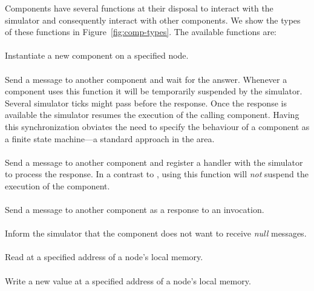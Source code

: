 Components have several functions at their disposal to interact with the simulator and consequently interact with other components.
We show the types of these functions in Figure~\ref{fig:comp-types}.
The available functions are:

\paragraph{}
Instantiate a new component on a specified node.
\paragraph{}
Send a message to another component and wait for the answer.
Whenever a component uses this function it will be temporarily suspended by the simulator.
Several simulator ticks might pass before the %
response.
Once the response is
available the simulator resumes the execution of the calling component.
Having this synchronization obviates the need to specify the behaviour of a component as a finite state machine---a standard approach in the area.
\paragraph{}
Send a message to another component and register a handler with the simulator to process the response.
In a contrast to , using this function will \emph{not} suspend the execution of the component.
\paragraph{}
Send a message to another component as a response to an invocation.
\paragraph{}
Inform the simulator that the component does not want to receive
\emph{null} messages.
\paragraph{}
Read at a specified address of a node's local memory.
\paragraph{}
Write a new value at a specified address of a node's local memory.
